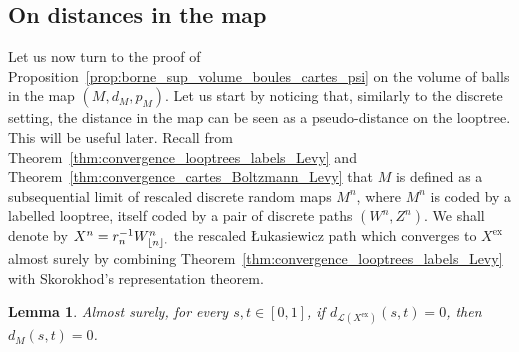 \documentclass[british, a4paper,11pt]{article}
\numberwithin{equation}{section}
\newtheorem{lem}[thm]{Lemma}
\theoremstyle{definition}
\newcommand{\Loop}{\mathscr{L}}
\newcommand{\Map}{M}
\newcommand{\exc}{\mathrm{ex}}
\DeclarePairedDelimiter\floor{\lfloor}{\rfloor}
\begin{document}
\subsection{On distances in the map}
\label{ssec:distances_carte}

Let us now turn to the proof of Proposition~\ref{prop:borne_sup_volume_boules_cartes_psi} on the volume of balls in the map $(\Map, d_\Map, p_\Map)$.
Let us start by noticing that, similarly to the discrete setting, the distance in the map can be seen as a pseudo-distance on the looptree. This will be useful later.
Recall from Theorem~\ref{thm:convergence_looptrees_labels_Levy} and Theorem~\ref{thm:convergence_cartes_Boltzmann_Levy} that $\Map$ is defined as a subsequential limit of rescaled discrete random maps $M^n$, where $M^n$ is coded by a labelled looptree, itself coded by a pair of discrete paths $(W^n, Z^n)$. We shall denote by $X^n = r_{n}^{-1} W^{n}_{\floor n\cdot}$ the rescaled {\L}ukasiewicz path which converges to $X^{\exc}$ almost surely by combining Theorem~\ref{thm:convergence_looptrees_labels_Levy} with Skorokhod's representation theorem.


\begin{lem}\label{lem:distance_map_on_looptree}
Almost surely, for every $s,t \in [0,1]$, if $d_{\Loop(X^{\exc})}(s,t) = 0$, then $d_\Map(s,t) = 0$.
\end{lem}
\end{document}
